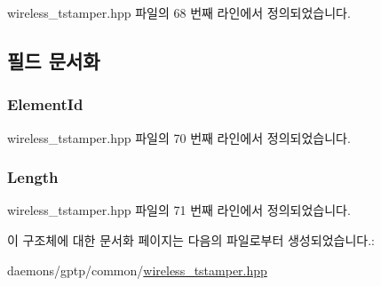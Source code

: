 wireless\+\_\+tstamper.\+hpp 파일의 68 번째 라인에서 정의되었습니다.



\subsection{필드 문서화}
\subsubsection[{\texorpdfstring{Element\+Id}{ElementId}}]{ Element\+Id}\hypertarget{struct___w_i_f_i___v_e_n_d_o_r___s_p_e_c___h_d_r_a55d82eac4c5510eecdd740196a0806c8}{}\label{struct___w_i_f_i___v_e_n_d_o_r___s_p_e_c___h_d_r_a55d82eac4c5510eecdd740196a0806c8}


wireless\+\_\+tstamper.\+hpp 파일의 70 번째 라인에서 정의되었습니다.

\subsubsection[{\texorpdfstring{Length}{Length}}]{ Length}\hypertarget{struct___w_i_f_i___v_e_n_d_o_r___s_p_e_c___h_d_r_a2b1ba85fe7425ab62c629e2d39646b24}{}\label{struct___w_i_f_i___v_e_n_d_o_r___s_p_e_c___h_d_r_a2b1ba85fe7425ab62c629e2d39646b24}


wireless\+\_\+tstamper.\+hpp 파일의 71 번째 라인에서 정의되었습니다.



이 구조체에 대한 문서화 페이지는 다음의 파일로부터 생성되었습니다.\+:\begin{DoxyCompactItemize}
\item 
daemons/gptp/common/\hyperlink{wireless__tstamper_8hpp}{wireless\+\_\+tstamper.\+hpp}\end{DoxyCompactItemize}
